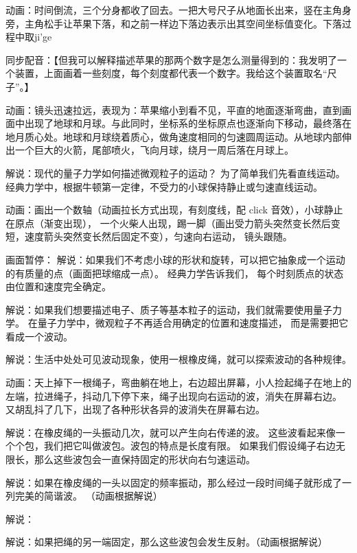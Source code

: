 动画：时间倒流，三个分身都收了回去。一把大号尺子从地面长出来，竖在主角身旁，主角松手让苹果下落，和之前一样边下落边表示出其空间坐标值变化。下落过程中取ji'ge


同步配音：【但我可以解释描述苹果的那两个数字是怎么测量得到的：我发明了一个装置，上面画着一些刻度，每个刻度都代表一个数字。我给这个装置取名“尺子”。】



动画：镜头迅速拉远，表现为：苹果缩小到看不见，平直的地面逐渐弯曲，直到画面中出现了地球和月球。与此同时，坐标系的坐标原点也逐渐向下移动，最终落在地月质心处。地球和月球绕着质心，做角速度相同的匀速圆周运动。从地球内部伸出一个巨大的火箭，尾部喷火，飞向月球，绕月一周后落在月球上。





解说：现代的量子力学如何描述微观粒子的运动？ 为了简单我们先看直线运动。 经典力学中，根据牛顿第一定律，不受力的小球保持静止或匀速直线运动。

动画：画出一个数轴（动画拉长方式出现，有刻度线，配 click 音效），小球静止在原点（渐变出现）， 一个火柴人出现，踢一脚（画出受力箭头突然变长然后变短，速度箭头突然变长然后固定不变），匀速向右运动， 镜头跟随。

画面暂停： 解说：如果我们不考虑小球的形状和旋转，可以把它抽象成一个运动的有质量的点（画面把球缩成一点）。 经典力学告诉我们， 每个时刻质点的状态由位置和速度完全确定。

解说：如果我们想要描述电子、质子等基本粒子的运动，我们就需要使用量子力学。 在量子力学中，微观粒子不再适合用确定的位置和速度描述， 而是需要把它看成一个波动。

解说：生活中处处可见波动现象，使用一根橡皮绳，就可以探索波动的各种规律。

动画：天上掉下一根绳子，弯曲躺在地上，右边超出屏幕，小人捡起绳子在地上的左端，拉进绳子，抖动几下停下来，绳子出现向右运动的波，消失在屏幕右边。 又胡乱抖了几下，出现了各种形状各异的波消失在屏幕右边。

解说：在橡皮绳的一头振动几次，就可以产生向右传递的波。 这些波看起来像一个个包，我们把它叫做波包。波包的特点是长度有限。 如果我们假设绳子右边无限长，那么这些波包会一直保持固定的形状向右匀速运动。

解说：如果在橡皮绳的一头以固定的频率振动，那么经过一段时间绳子就形成了一列完美的简谐波。
（动画根据解说）

解说：

解说：如果把绳的另一端固定，那么这些波包会发生反射。（动画根据解说）




